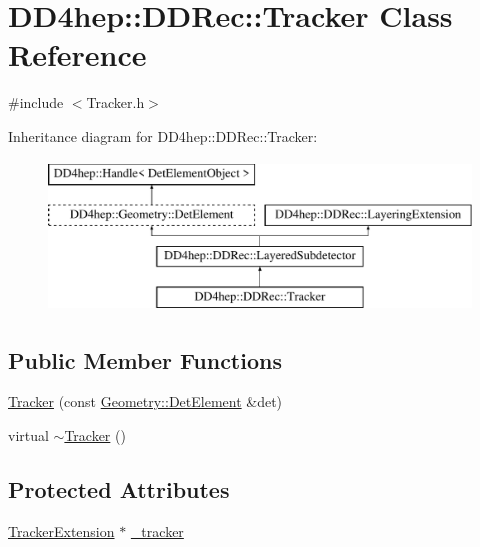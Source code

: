 \hypertarget{class_d_d4hep_1_1_d_d_rec_1_1_tracker}{}\section{D\+D4hep\+:\+:D\+D\+Rec\+:\+:Tracker Class Reference}
\label{class_d_d4hep_1_1_d_d_rec_1_1_tracker}


{\ttfamily \#include $<$Tracker.\+h$>$}

Inheritance diagram for D\+D4hep\+:\+:D\+D\+Rec\+:\+:Tracker\+:\begin{figure}[H]
\begin{center}
\leavevmode
\includegraphics[height=4.000000cm]{class_d_d4hep_1_1_d_d_rec_1_1_tracker}
\end{center}
\end{figure}
\subsection*{Public Member Functions}
\begin{DoxyCompactItemize}
\item 
\hyperlink{class_d_d4hep_1_1_d_d_rec_1_1_tracker_acd3f6faae57cfcd0cf7925e1473358ba}{Tracker} (const \hyperlink{class_d_d4hep_1_1_geometry_1_1_det_element}{Geometry\+::\+Det\+Element} \&det)
\item 
virtual \hyperlink{class_d_d4hep_1_1_d_d_rec_1_1_tracker_a8ac29fb4a453989eebf2201e6a2fca9f}{$\sim$\+Tracker} ()
\end{DoxyCompactItemize}
\subsection*{Protected Attributes}
\begin{DoxyCompactItemize}
\item 
\hyperlink{class_d_d4hep_1_1_d_d_rec_1_1_tracker_extension}{Tracker\+Extension} $\ast$ \hyperlink{class_d_d4hep_1_1_d_d_rec_1_1_tracker_a93fc69a19d898507a7c887b9f44b4663}{\+\_\+tracker}
\end{DoxyCompactItemize}
